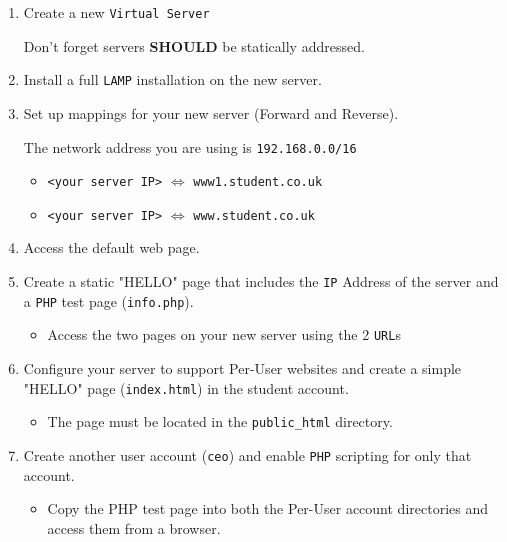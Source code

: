 \documentclass[11pt]{article}
\begin{document}
\begin{enumerate}
    \item Create a new \texttt{Virtual Server} 
        \begin{tcolorbox}[title={\textbf{NOTE:}}]
            \noindent Don't forget servers \textbf{SHOULD} be statically addressed.
        \end{tcolorbox}
    \item Install a full \texttt{LAMP} installation on the new server.
    \item Set up mappings for your new server (Forward and Reverse).
        \begin{tcolorbox}[title={\textbf{NOTE:}}]
            \noindent The network address you are using is \texttt{192.168.0.0/16}
        \end{tcolorbox}
        \begin{itemize}
            \item \texttt{<your server IP>} $\Leftrightarrow$ \texttt{www1.student.co.uk}
            \item \texttt{<your server IP>} $\Leftrightarrow$ \texttt{www.student.co.uk}
        \end{itemize}
    \item Access the default web page.
    \item Create a static "HELLO" page that includes the \texttt{IP} Address of the server and a \texttt{PHP} test page (\texttt{info.php}).
        \begin{itemize}
            \item Access the two pages on your new server using the 2 \texttt{URL}s
        \end{itemize}
    \item Configure your server to support Per-User websites and create a simple "HELLO" page (\texttt{index.html}) in the student account.
        \begin{itemize}
            \item The page must be located in the \texttt{public\_html} directory.
        \end{itemize}
    \item Create another user account (\texttt{ceo}) and enable \texttt{PHP} scripting for only that account.
        \begin{itemize}
            \item Copy the PHP test page into both the Per-User account directories and access them from a browser.
                \begin{tcolorbox}[title={\textbf{NOTE:}}]

\end{tcolorbox}
\end{itemize}
\end{enumerate}
\end{document}
